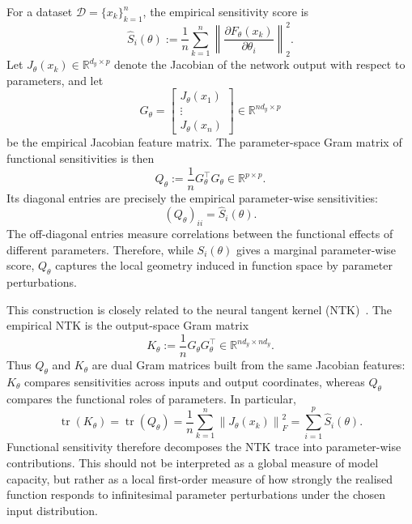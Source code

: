 \documentclass{article}
\theoremstyle{definition}
\theoremstyle{remark}
\begin{document}
For a dataset \(\mathcal D=\{x_k\}_{k=1}^n\), the empirical sensitivity score is
\begin{equation}
    \widehat S_i(\theta)
    :=
    \frac1n
    \sum_{k=1}^n
    \left\|
        \frac{\partial F_\theta(x_k)}{\partial\theta_i}
    \right\|_2^2.
\end{equation}
Let \(J_\theta(x_k)\in\mathbb R^{d_y\times p}\) denote the Jacobian of the network output with respect to parameters, and let
\[
    G_\theta
    =
    \begin{bmatrix}
        J_\theta(x_1)\\
        \vdots\\
        J_\theta(x_n)
    \end{bmatrix}
    \in\mathbb R^{nd_y\times p}
\]
be the empirical Jacobian feature matrix. The parameter-space Gram matrix of functional sensitivities is then
\begin{equation}
    Q_\theta
    :=
    \frac1n
    G_\theta^\top G_\theta
    \in\mathbb R^{p\times p}.
    \label{eq:parameter-gram}
\end{equation}
Its diagonal entries are precisely the empirical parameter-wise sensitivities:
\begin{equation}
    (Q_\theta)_{ii}
    =
    \widehat S_i(\theta).
\end{equation}
The off-diagonal entries measure correlations between the functional effects of different parameters. Therefore, while \(S_i(\theta)\) gives a marginal parameter-wise score, \(Q_\theta\) captures the local geometry induced in function space by parameter perturbations.

This construction is closely related to the neural tangent kernel (NTK)~\cite{Jacot_2018}. The empirical NTK is the output-space Gram matrix
\begin{equation}
    K_\theta
    :=
    \frac1n
    G_\theta G_\theta^\top
    \in\mathbb R^{nd_y\times nd_y}.
\end{equation}
Thus \(Q_\theta\) and \(K_\theta\) are dual Gram matrices built from the same Jacobian features: \(K_\theta\) compares sensitivities across inputs and output coordinates, whereas \(Q_\theta\) compares the functional roles of parameters. In particular,
\begin{equation}
    \operatorname{tr}(K_\theta)
    =
    \operatorname{tr}(Q_\theta)
    =
    \frac1n
    \sum_{k=1}^n
    \left\|J_\theta(x_k)\right\|_F^2
    =
    \sum_{i=1}^p
    \widehat S_i(\theta).
    \label{eq:ntk-trace-sensitivity}
\end{equation}
Functional sensitivity therefore decomposes the NTK trace into parameter-wise contributions. This should not be interpreted as a global measure of model capacity, but rather as a local first-order measure of how strongly the realised function responds to infinitesimal parameter perturbations under the chosen input distribution.
\end{document}
